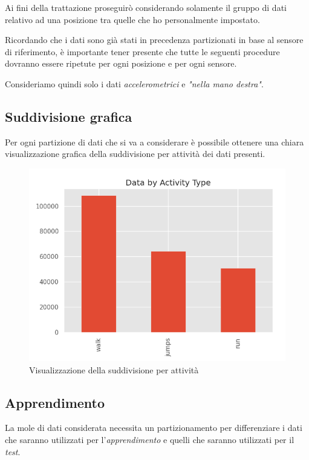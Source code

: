 \vspace{5mm} %

Ai fini della trattazione proseguirò considerando solamente il gruppo di dati relativo ad una posizione 
tra quelle che ho personalmente impostato.

Ricordando che i dati sono già stati in precedenza partizionati in base al sensore di riferimento, è importante tener presente 
che tutte le seguenti procedure dovranno essere ripetute per ogni posizione e per ogni sensore.

\vspace{5mm} %

Consideriamo quindi solo i dati \textit{accelerometrici} e \textit{"nella mano destra"}.


\subsection{Suddivisione grafica}
Per ogni partizione di dati che si va a considerare è possibile ottenere una chiara visualizzazione grafica 
della suddivisione per attività dei dati presenti.
\begin{figure}[H]
    \centering
    \includegraphics[scale = 0.60]{assets/images/classifications/accelerometer/right_hand/activity-type-graph-right-hand-acc.png}
    \caption{Visualizzazione della suddivisione per attività}
\end{figure}


\subsection{Apprendimento}
La mole di dati considerata necessita un partizionamento per differenziare i dati che saranno utilizzati per 
l'\textit{apprendimento} e quelli che saranno utilizzati per il \textit{test}.

